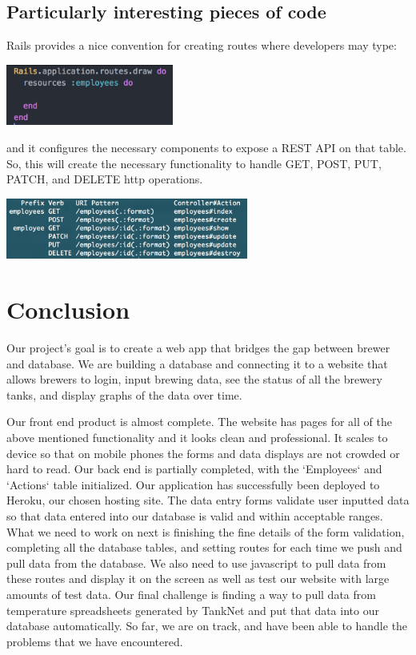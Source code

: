 \documentclass[draftclsnofoot,onecolumn,letterpaper,10pt,compsoc]{IEEEtran}
\begin{document}
\subsection{Particularly interesting pieces of code}
Rails provides a nice convention for creating routes where developers may type:

\centerline{\includegraphics[height=2cm]{screenshots/routesrb.png}}

and it configures the necessary components to expose a REST API on that table.
So, this will create the necessary functionality to handle GET, POST, PUT, PATCH, and DELETE http operations.

\centerline{\includegraphics[height=2cm]{screenshots/showroutes.png}}

\section{Conclusion}
Our project's goal is to create a web app that bridges the gap between brewer and database.
We are building a database and connecting it to a website that allows brewers to login, input brewing data, see the status of all the brewery tanks, and display graphs of the data over time.


Our front end product is almost complete.
The website has pages for all of the above mentioned functionality and it looks clean and professional.
It scales to device so that on mobile phones the forms and data displays are not crowded or hard to read.
Our back end is partially completed, with the  `Employees` and `Actions` table initialized.
Our application has successfully been deployed to Heroku, our chosen hosting site.
The data entry forms validate user inputted data so that data entered into our database is valid and within acceptable ranges.
What we need to work on next is finishing the fine details of the form validation, completing all the database tables, and setting routes for each time we push and pull data from the database.
We also need to use javascript to pull data from these routes and display it on the screen as well as test our website with large amounts of test data.
Our final challenge is finding a way to pull data from temperature spreadsheets generated by TankNet and put that data into our database automatically.
So far, we are on track, and have been able to handle the problems that we have encountered.
\end{document}
